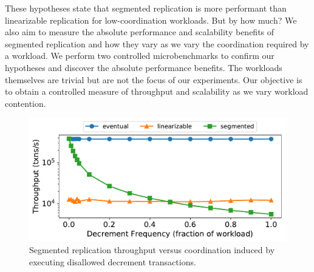 These hypotheses state that segmented \invariantconfluent{} replication is more
performant than linearizable replication for low-coordination workloads. But by
how much?  We also aim to measure the absolute performance and scalability
benefits of segmented \invariantconfluent{} replication and how they vary as we
vary the coordination required by a workload. We perform two controlled
microbenchmarks to confirm our hypotheses and discover the absolute performance
benefits. The workloads themselves are trivial but are not the focus of our
experiments. Our objective is to obtain a controlled measure of throughput and
scalability as we vary workload contention.

\begin{figure}[t]
  \centering
  \includegraphics[width=\columnwidth]{figures/throughput_vs_fraction_16.pdf}
  \caption{%
    Segmented \invariantconfluent{} replication throughput versus coordination
    induced by executing disallowed decrement transactions.
  }
\end{figure}

